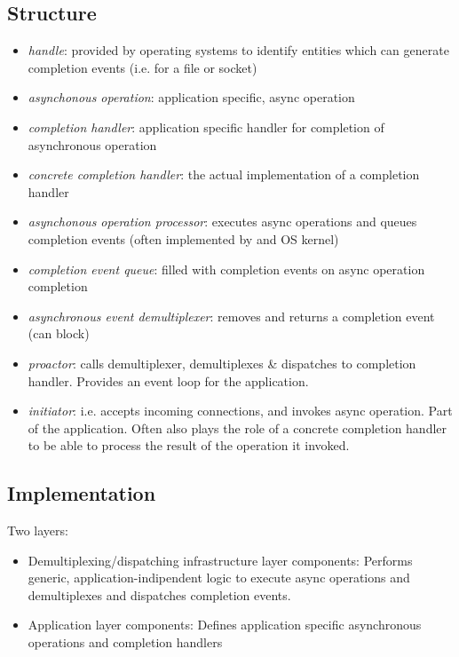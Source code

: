 \subsection*{Structure}

\begin{itemize}
	\item \emph{handle}: provided by operating systems to identify entities which can generate completion events (i.e. for a file or socket)
	\item \emph{asynchonous operation}: application specific, async operation
	\item \emph{completion handler}: application specific handler for completion of asynchronous operation
	\item \emph{concrete completion handler}: the actual implementation of a completion handler
	\item \emph{asynchonous operation processor}: executes async operations and queues completion events (often implemented by and OS kernel)
	\item \emph{completion event queue}: filled with completion events on async operation completion
	\item \emph{asynchronous event demultiplexer}: removes and returns a completion event (can block)
	\item \emph{proactor}: calls demultiplexer, demultiplexes \& dispatches to completion handler. Provides an event loop for the application.
	\item \emph{initiator}: i.e. accepts incoming connections, and invokes async operation. Part of the application. Often also plays the role of a concrete completion handler to be able to process the result of the operation it invoked.
\end{itemize}


\subsection*{Implementation}

Two layers:
\begin{itemize}
	\item Demultiplexing/dispatching infrastructure layer components: Performs generic, application-indipendent logic to execute async operations and demultiplexes and dispatches completion events.
	\item Application layer components: Defines application specific asynchronous operations and completion handlers
\end{itemize}

